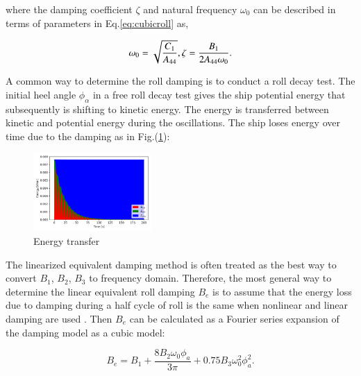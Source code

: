 where the damping coefficient $\zeta$ and natural frequency $\omega_0$ can be described in terms of parameters in Eq.\eqref{eq:cubicroll} as,
            
    
\begin{equation}\label{eq:omega_zeta}
\omega_{0} = \sqrt{\frac{C_{1}}{A_{44}}},\\
\zeta = \frac{B_{1}}{2 A_{44} \omega_{0}} .
\end{equation}




A common way to determine the roll damping is to conduct a roll decay test. The initial heel angle $\phi_\alpha$ in a free roll decay test gives the ship potential energy that subsequently is shifting to kinetic energy. The energy is transferred between kinetic and potential energy during the oscillations. The ship loses energy over time due to the damping as in Fig.(\ref{fig:energy}):
    
    \begin{figure}[H]
        \begin{center}
        \includegraphics[width = 0.4\textwidth]{figures/energy.png}\end{center}
        \vspace{-1cm}
        \caption{Energy transfer}
        \label{fig:energy}
    \end{figure}

The linearized equivalent damping method is often treated as the best way to convert $B_1$, $B_2$, $B_3$ to frequency domain. Therefore, the most general way to determine the linear equivalent roll damping $B_e$ is to assume that the energy loss due to damping during a half cycle of roll is the same when nonlinear and linear damping are used \cite{7505983/RYUBZITQ}. Then $B_e$ can be calculated as a Fourier series expansion of the damping model as a cubic model:
    
\begin{equation}\label{eq:be_cubic}
B_{e} = B_{1} + \frac{8 B_{2} \omega_{0} \phi_{a}}{3 \pi} + 0.75 B_{3} \omega_{0}^{2} \phi_{a}^{2}.
\end{equation}

